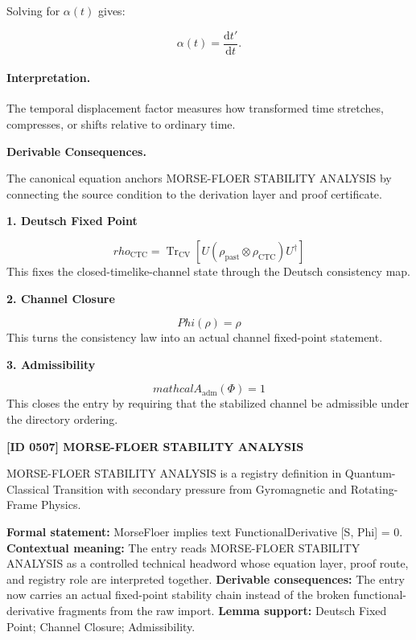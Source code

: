 Solving for $\alpha(t)$ gives:

\begin{equation}
\boxed{
\alpha(t)=\frac{\mathrm{d}t'}{\mathrm{d}t}.
}
\end{equation}

\paragraph{Interpretation.}
The temporal displacement factor measures how transformed time stretches, compresses, or shifts relative to ordinary time.

\par\vspace{0.35em}
\noindent\textbf{Derivable Consequences.}\quad
\begingroup
\footnotesize
\raggedright
The canonical equation anchors MORSE-FLOER STABILITY ANALYSIS by connecting the source condition to the derivation layer and proof certificate.
\par\endgroup

\noindent\textbf{1. Deutsch Fixed Point}\par
\[
rho_{\mathrm{CTC}} = \operatorname{Tr}_{\mathrm{CV}}\!\left[U(\rho_{\mathrm{past}}\otimes\rho_{\mathrm{CTC}})U^{\dagger}\right]
\]
\noindent This fixes the closed-timelike-channel state through the Deutsch consistency map.\par
\noindent\textbf{2. Channel Closure}\par
\[
Phi(\rho)=\rho
\]
\noindent This turns the consistency law into an actual channel fixed-point statement.\par
\noindent\textbf{3. Admissibility}\par
\[
mathcal{A}_{\mathrm{adm}}\!\left(\Phi\right)=1
\]
\noindent This closes the entry by requiring that the stabilized channel be admissible under the directory ordering.\par

\clearpage
\noindent\textbf{[ID 0507] MORSE-FLOER STABILITY ANALYSIS}\par
\vspace{0.35em}
\begingroup\small
{}
MORSE-FLOER STABILITY ANALYSIS is a registry definition in Quantum-Classical Transition with secondary pressure from Gyromagnetic and Rotating-Frame Physics.

\begingroup\footnotesize\setlength{\emergencystretch}{3em}\sloppy
\textbf{Formal statement:} MorseFloer implies text FunctionalDerivative [S, Phi] = 0. \textbf{Contextual meaning:} The entry reads MORSE-FLOER STABILITY ANALYSIS as a controlled technical headword whose equation layer, proof route, and registry role are interpreted together. \textbf{Derivable consequences:} The entry now carries an actual fixed-point stability chain instead of the broken functional-derivative fragments from the raw import. \textbf{Lemma support:} Deutsch Fixed Point; Channel Closure; Admissibility.\par
\endgroup

